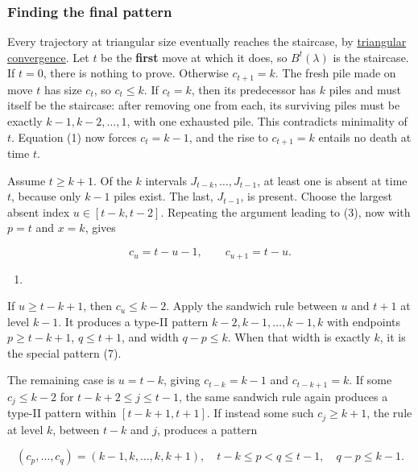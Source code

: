 \documentclass[11pt,a4paper]{article}
\providecommand{\tightlist}{\setlength{\itemsep}{0pt}\setlength{\parskip}{0pt}}
\begin{document}
\subsubsection{Finding the final pattern}\label{finding-the-final-pattern}

Every trajectory at triangular size eventually reaches the staircase, by \href{https://github.com/mpelteshki/climbing-to-the-frontier/blob/212bba53b1818c08c40b8c4b48f636651eaf6410/cagent/p3/lean/ProofPursuit/P3/TriangularGeneral.lean}{triangular convergence}. Let \(t\) be the \textbf{first} move at which it does, so \(B^t(\lambda)\) is the staircase. If \(t=0\), there is nothing to prove. Otherwise \(c_{t+1}=k\). The fresh pile made on move \(t\) has size \(c_t\), so \(c_t\le k\). If \(c_t=k\), then its predecessor has \(k\) piles and must itself be the staircase: after removing one from each, its surviving piles must be exactly \(k-1,k-2,\ldots,1\), with one exhausted pile. This contradicts minimality of \(t\). Equation (1) now forces \(c_t=k-1\), and the rise to \(c_{t+1}=k\) entails no death at time \(t\).

Assume \(t\ge k+1\). Of the \(k\) intervals \(J_{t-k},\ldots,J_{t-1}\), at least one is absent at time \(t\), because only \(k-1\) piles exist. The last, \(J_{t-1}\), is present. Choose the largest absent index \(u\in[t-k,t-2]\). Repeating the argument leading to (3), now with \(p=t\) and \(x=k\), gives

\[
c_u=t-u-1,\qquad c_{u+1}=t-u.
\]

\begin{enumerate}
\def\labelenumi{(\arabic{enumi})}
\setcounter{enumi}{8}
\tightlist
\item
\end{enumerate}

If \(u\ge t-k+1\), then \(c_u\le k-2\). Apply the sandwich rule between \(u\) and \(t+1\) at level \(k-1\). It produces a type-II pattern \(k-2,k-1,\ldots,k-1,k\) with endpoints \(p\ge t-k+1\), \(q\le t+1\), and width \(q-p\le k\). When that width is exactly \(k\), it is the special pattern (7).

The remaining case is \(u=t-k\), giving \(c_{t-k}=k-1\) and \(c_{t-k+1}=k\). If some \(c_j\le k-2\) for \(t-k+2\le j\le t-1\), the same sandwich rule again produces a type-II pattern within \([t-k+1,t+1]\). If instead some such \(c_j\ge k+1\), the rule at level \(k\), between \(t-k\) and \(j\), produces a pattern

\[
(c_p,\ldots,c_q)=(k-1,k,\ldots,k,k+1),
\quad t-k\le p<q\le t-1,
\quad q-p\le k-1.
\]
\end{document}
